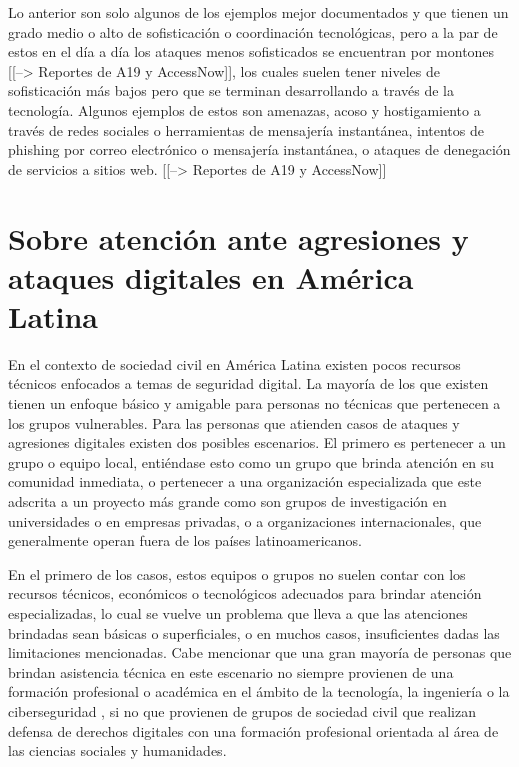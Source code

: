 \documentclass[12pt]{caltech_thesis}
\begin{document}
Lo anterior son solo algunos de los ejemplos mejor documentados y que tienen un grado medio o alto de sofisticación o coordinación tecnológicas, pero a la par de estos en el día a día los ataques menos sofisticados se encuentran por montones [[--> Reportes de A19 y AccessNow]], los cuales suelen tener niveles de sofisticación más bajos pero que se terminan desarrollando a través de la tecnología. Algunos ejemplos de estos son amenazas, acoso y hostigamiento a través de redes sociales o herramientas de mensajería instantánea, intentos de phishing por correo electrónico o mensajería instantánea, o ataques de denegación de servicios a sitios web. [[--> Reportes de A19 y AccessNow]]

\section{Sobre atención ante agresiones y ataques digitales en América Latina}

En el contexto de sociedad civil en América Latina  existen pocos recursos técnicos enfocados a temas de seguridad digital. La mayoría de los que existen tienen un enfoque básico y amigable para personas no técnicas que pertenecen a los grupos vulnerables. Para las personas que atienden casos de ataques y agresiones digitales existen dos posibles escenarios. El primero es pertenecer a un grupo o equipo local, entiéndase esto como un grupo que brinda atención en su comunidad inmediata, o pertenecer a una organización especializada que este adscrita a un proyecto más grande como son grupos de investigación en universidades o en empresas privadas, o a organizaciones internacionales, que generalmente operan fuera de los países latinoamericanos.

En el primero de los casos, estos equipos o grupos no suelen contar con los recursos técnicos, económicos o tecnológicos adecuados para brindar atención especializadas, lo cual se vuelve un problema que lleva a que las atenciones brindadas sean básicas o superficiales, o en muchos casos, insuficientes dadas las limitaciones mencionadas. Cabe mencionar que una gran mayoría de personas que brindan asistencia técnica en este escenario no siempre provienen de una formación profesional o académica en el ámbito de la tecnología, la ingeniería o la ciberseguridad , si no que provienen de grupos de sociedad civil que realizan defensa de derechos digitales  con una formación profesional orientada al área de las ciencias sociales y humanidades.
\end{document}
